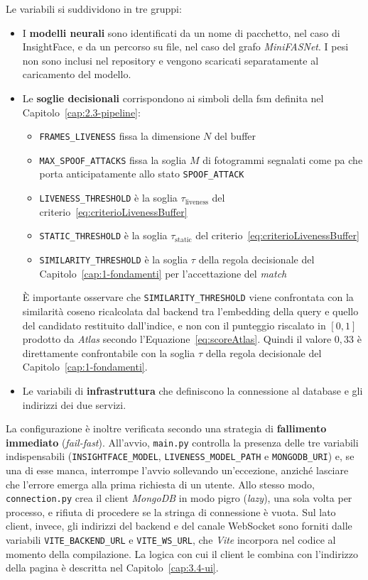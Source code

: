 Le variabili si suddividono in tre gruppi:
\begin{itemize}
    \item I \textbf{modelli neurali} sono identificati da un nome di pacchetto, nel caso di InsightFace, e da un percorso su file, nel caso del grafo \textit{MiniFASNet}. I pesi non sono inclusi nel repository e vengono scaricati separatamente al caricamento del modello.
    \item Le \textbf{soglie decisionali} corrispondono ai simboli della \gls{fsm} definita nel Capitolo~\ref{cap:2.3-pipeline}: \begin{itemize}
    \item \texttt{FRAMES\_LIVENESS} fissa la dimensione $N$ del buffer
    \item \texttt{MAX\_SPOOF\_ATTACKS} fissa la soglia $M$ di fotogrammi segnalati come \gls{pa} che porta anticipatamente allo stato \texttt{SPOOF\_ATTACK}
    \item \texttt{LIVENESS\_THRESHOLD} è la soglia $\tau_{\text{liveness}}$ del criterio~\eqref{eq:criterioLivenessBuffer}
    \item \texttt{STATIC\_THRESHOLD} è la soglia $\tau_{\text{static}}$ del criterio~\eqref{eq:criterioLivenessBuffer}
    \item \texttt{SIMILARITY\_THRESHOLD} è la soglia $\tau$ della regola decisionale del Capitolo~\ref{cap:1-fondamenti} per l'accettazione del \textit{match}
    \end{itemize}
È importante osservare che \texttt{SIMILARITY\_THRESHOLD} viene confrontata con la similarità coseno ricalcolata dal backend tra l'embedding della query e quello del candidato restituito dall'indice, e non con il punteggio riscalato in $[0,1]$ prodotto da \textit{Atlas} secondo l'Equazione~\eqref{eq:scoreAtlas}. Quindi il valore $0{,}33$ è direttamente confrontabile con la soglia $\tau$ della regola decisionale del Capitolo~\ref{cap:1-fondamenti}.
\item Le variabili di \textbf{infrastruttura} che definiscono la connessione al database e gli indirizzi dei due servizi.
\end{itemize}

La configurazione è inoltre verificata secondo una strategia di \textbf{fallimento immediato} (\textit{fail-fast}).
All'avvio, \texttt{main.py} controlla la presenza delle tre variabili indispensabili (\texttt{INSIGHTFACE\_MODEL}, \texttt{LIVENESS\_MODEL\_PATH} e \texttt{MONGODB\_URI}) e, se una di esse manca, interrompe l'avvio sollevando un'eccezione, anziché lasciare che l'errore emerga alla prima richiesta di un utente.
Allo stesso modo, \texttt{connection.py} crea il client \textit{MongoDB} in modo pigro (\textit{lazy}), una sola volta per processo, e rifiuta di procedere se la stringa di connessione è vuota.
Sul lato client, invece, gli indirizzi del backend e del canale WebSocket sono forniti dalle variabili \texttt{VITE\_BACKEND\_URL} e \texttt{VITE\_WS\_URL}, che \textit{Vite} incorpora nel codice al momento della compilazione.
La logica con cui il client le combina con l'indirizzo della pagina è descritta nel Capitolo~\ref{cap:3.4-ui}.

